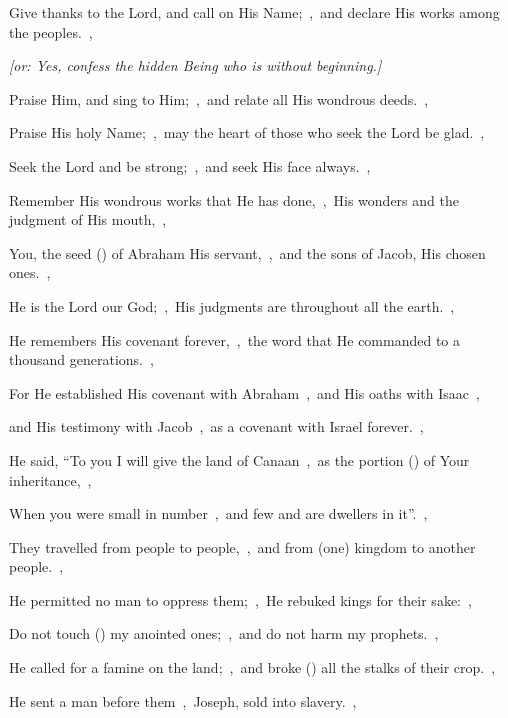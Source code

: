 \documentclass[12pt,twoside,a5paper]{article}
\begin{document}
\begin{normalparskip}
  Give thanks to the Lord, and call on His Name;~\sep\ and declare His works among the peoples.~\sep


  \emph{[or: Yes, confess the hidden Being who is without beginning.]}

  Praise Him, and sing to Him;~\sep\ and relate all His wondrous deeds.~\sep

  Praise His holy Name;~\sep\ may the heart of those who seek the Lord be glad.~\sep

  Seek the Lord and be strong;~\sep\ and seek His face always.~\sep

  Remember His wondrous works that He has done,~\sep\ His wonders and the judgment of His mouth,~\sep

  You, the seed () of Abraham His servant,~\sep\ and the sons of Jacob, His chosen ones.~\sep

  He is the Lord our God;~\sep\ His judgments are throughout all the earth.~\sep

  He remembers His covenant forever,~\sep\ the word that He commanded to a thousand generations.~\sep

  For He established His covenant with Abraham~\sep\ and His oaths with Isaac~\sep

  and His testimony with Jacob~\sep\ as a covenant with Israel forever.~\sep

  He said, ``To you I will give the land of Canaan~\sep\ as the portion () of Your inheritance,~\sep

  When you were small in number~\sep\ and few and are dwellers in it''.~\sep

  They travelled from people to people,~\sep\ and from (one) kingdom to another people.~\sep

  He permitted no man to oppress them;~\sep\ He rebuked kings for their sake:~\sep

  Do not touch () my anointed ones;~\sep\ and do not harm my prophets.~\sep

  He called for a famine on the land;~\sep\ and broke () all the stalks of their crop.~\sep

  He sent a man before them~\sep\ Joseph, sold into slavery.~\sep


\end{normalparskip}
\end{document}
